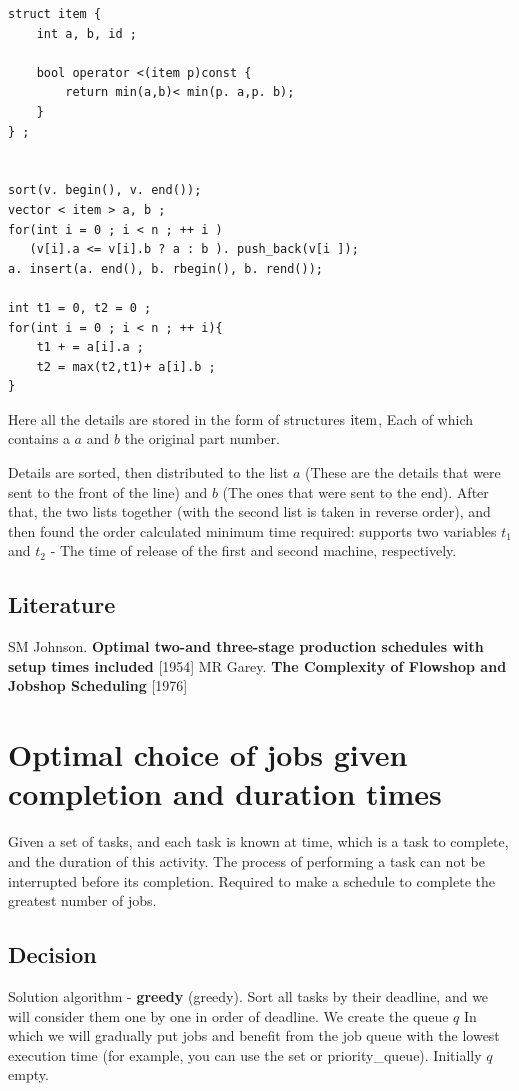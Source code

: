 \begin{verbatim}
struct item {
    int a, b, id ;
 
    bool operator <(item p)const {
        return min(a,b)< min(p. a,p. b);
    }
} ;
 
 
sort(v. begin(), v. end());
vector < item > a, b ;
for(int i = 0 ; i < n ; ++ i )
   (v[i].a <= v[i].b ? a : b ). push_back(v[i ]);
a. insert(a. end(), b. rbegin(), b. rend());
 
int t1 = 0, t2 = 0 ;
for(int i = 0 ; i < n ; ++ i){
    t1 + = a[i].a ;
    t2 = max(t2,t1)+ a[i].b ;
} 
\end{verbatim}
Here all the details are stored in the form of structures $\rm item$, Each of which contains a $a$ and $b$ the original part number.

Details are sorted, then distributed to the list $a$ (These are the details that were sent to the front of the line) and $b$ (The ones that were sent to the end). After that, the two lists together (with the second list is taken in reverse order), and then found the order calculated minimum time required: supports two variables $t_1$ and $t_2$ - The time of release of the first and second machine, respectively.

\subsection{ Literature }

SM Johnson. \textbf{Optimal two-and three-stage production schedules with setup times included} [1954]
MR Garey. \textbf{The Complexity of Flowshop and Jobshop Scheduling} [1976]

\section{ Optimal choice of jobs given completion and duration times }
Given a set of tasks, and each task is known at time, which is a task to complete, and the duration of this activity. The process of performing a task can not be interrupted before its completion. Required to make a schedule to complete the greatest number of jobs.

\subsection{ Decision }

Solution algorithm - \textbf{greedy} (greedy). Sort all tasks by their deadline, and we will consider them one by one in order of deadline. We create the queue $q$ In which we will gradually put jobs and benefit from the job queue with the lowest execution time (for example, you can use the set or priority\_queue). Initially $q$ empty.

